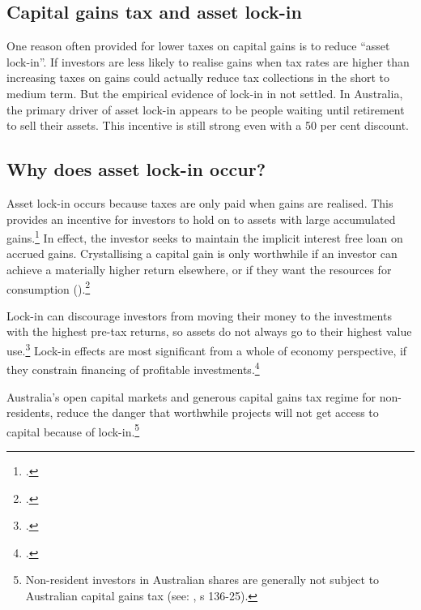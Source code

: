 \clearpage
%




\begin{subappendices}
\chapter{Capital gains tax and asset lock-in}\label{appendix:CGT-asset-lock-in}
One reason often provided for lower taxes on capital gains is to reduce ``asset lock-in''. If investors are less likely to realise gains when tax rates are higher than increasing taxes on gains could actually reduce tax collections in the short to medium term. But the empirical evidence of lock-in in not settled. In Australia, the primary driver of asset lock-in appears to be people waiting until retirement to sell their assets. This incentive is still strong even with a 50 per cent discount. 

\section{Why does asset lock-in occur?}
Asset lock-in occurs because taxes are only paid when gains are realised. This provides an incentive for investors to hold on to assets with large accumulated gains.\footcite{Burman2009}  In effect, the investor seeks to maintain the implicit interest free loan on accrued gains. Crystallising a capital gain is only worthwhile if an investor can achieve a materially higher return elsewhere, or if they want the resources for consumption ().\footcite[][12]{Ingles2009a}   

Lock-in can discourage investors from moving their money to the investments with the highest pre-tax returns, so assets do not always go to their highest value use.\footcite{Lindsey1987}  Lock-in effects are most significant from a whole of economy perspective, if they constrain financing of profitable investments.\footcites{OECD2006TaxationOfCapitalGains}{Johnson2008}  


Australia’s open capital markets and generous capital gains tax regime for non-residents, reduce the danger that worthwhile projects will not get access to capital because of lock-in.\footnote{Non-resident investors in Australian shares are generally not subject to Australian capital gains tax (see: , s 136-25). } 


\end{subappendices}
